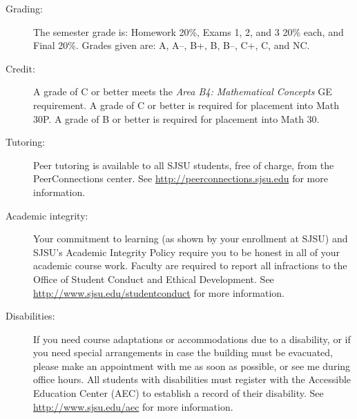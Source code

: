 \documentclass[letterpaper,12pt,fleqn]{article}
\begin{document}
\begin{description}
\item[Grading:] The semester grade is: Homework 20\%, Exams 1, 2, and 3 20\%
    each, and Final 20\%. Grades given are: A, A--, B+, B, B--, C+, C, and NC.

\item[Credit:] A grade of C or better meets the \emph{Area B4: Mathematical
    Concepts} GE requirement. A grade of C or better is required for placement
    into Math 30P. A grade of B or better is required for placement into
    Math 30.

\item[Tutoring:] Peer tutoring is available to all SJSU students, free of
    charge, from the PeerConnections center. See
    \url{http://peerconnections.sjsu.edu} for more information.

\item[Academic integrity:] Your commitment to learning (as shown by your
    enrollment at SJSU) and SJSU's Academic Integrity Policy require you to be
    honest in all of your academic course work.  Faculty are required to report
    all infractions to the Office of Student Conduct and Ethical Development.
    See \url{http://www.sjsu.edu/studentconduct} for more information.

\item[Disabilities:] If you need course adaptations or accommodations due to a
    disability, or if you need special arrangements in case the building must
    be evacuated, please make an appointment with me as soon as possible, or
    see me during office hours. All students with disabilities must register
    with the Accessible Education Center (AEC) to establish a record of their
    disability. See \url{http://www.sjsu.edu/aec} for more information.

\end{description}
\end{document}
